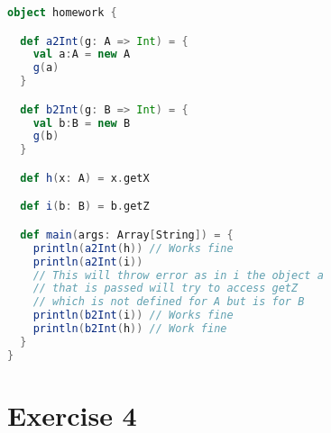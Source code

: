 \documentclass[12pt]{article}
\begin{document}
\begin{enumerate}[label=(\alph*)]
\begin{lstlisting}[language=Scala]
object homework {

  def a2Int(g: A => Int) = {
    val a:A = new A
    g(a)
  }

  def b2Int(g: B => Int) = {
    val b:B = new B
    g(b)
  }

  def h(x: A) = x.getX

  def i(b: B) = b.getZ

  def main(args: Array[String]) = {
    println(a2Int(h)) // Works fine
    println(a2Int(i))
    // This will throw error as in i the object a
    // that is passed will try to access getZ
    // which is not defined for A but is for B
    println(b2Int(i)) // Works fine
    println(b2Int(h)) // Work fine
  }
}
\end{lstlisting}

\end{enumerate}

\newpage

\section*{Exercise 4}
\end{document}
